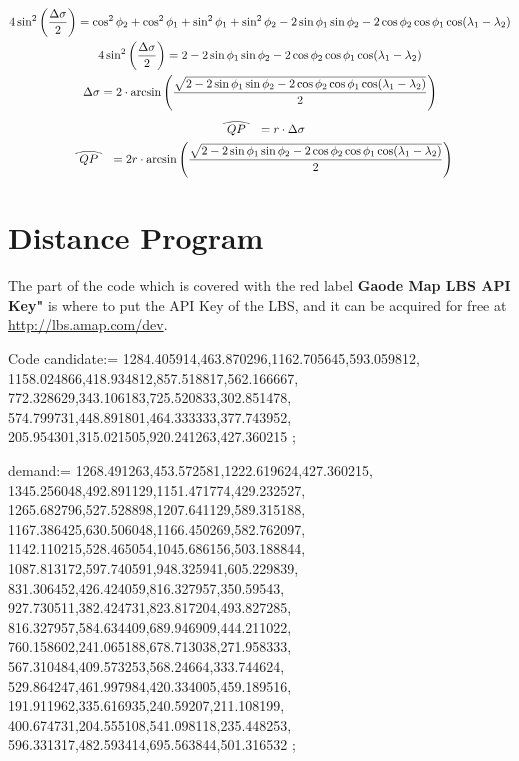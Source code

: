 \documentclass[10pt]{article}
\newcommand\bigfrown[2][\textstyle]{\ensuremath{%
  \array[b]{c}\text{\resizebox{6ex}{.7ex}{$#1\frown$}}\\[-1.3ex]#1#2\endarray}}
\begin{document}
\begin{gather}
4\sin^2\left(\frac{\Delta\sigma}{2}\right)=\cos^2\phi_2+\cos^2\phi_1+\sin^2\phi_1+\sin^2\phi_2-2\sin\phi_1\sin\phi_2-2\cos\phi_2\cos\phi_1\cos(\lambda_1-\lambda_2)\\
\allowdisplaybreaks
4\sin^2\left(\frac{\Delta\sigma}{2}\right)=2-2\sin\phi_1\sin\phi_2-2\cos\phi_2\cos\phi_1\cos(\lambda_1-\lambda_2)\\
\allowdisplaybreaks
\Delta\sigma=2\cdot\arcsin\left(\frac{\sqrt{2-2\sin\phi_1\sin\phi_2-2\cos\phi_2\cos\phi_1\cos(\lambda_1-\lambda_2)}}{2}\right)\\
\allowdisplaybreaks
\bigfrown{QP}=r\cdot\Delta\sigma\\
\allowdisplaybreaks
\bigfrown{QP}=2r\cdot\arcsin\left(\frac{\sqrt{2-2\sin\phi_1\sin\phi_2-2\cos\phi_2\cos\phi_1\cos(\lambda_1-\lambda_2)}}{2}\right)
\end{gather}

\section{Distance Program}

The part of the code which is covered with the red label \textbf{Gaode Map LBS API Key"} is where to put the API Key of the LBS, and it can be acquired for free at \href{http://lbs.amap.com/dev}{http://lbs.amap.com/dev}.

\begin{mmaCell}[moredefined={candidate, demand}]{Code}
  candidate:={
    {1284.405914,463.870296},{1162.705645,593.059812},
    {1158.024866,418.934812},{857.518817,562.166667},
    {772.328629,343.106183},{725.520833,302.851478},
    {574.799731,448.891801},{464.333333,377.743952},
    {205.954301,315.021505},{920.241263,427.360215}
  };

  demand:={
    {1268.491263,453.572581},{1222.619624,427.360215},
    {1345.256048,492.891129},{1151.471774,429.232527},
    {1265.682796,527.528898},{1207.641129,589.315188},
    {1167.386425,630.506048},{1166.450269,582.762097},
    {1142.110215,528.465054},{1045.686156,503.188844},
    {1087.813172,597.740591},{948.325941,605.229839},
    {831.306452,426.424059},{816.327957,350.59543},
    {927.730511,382.424731},{823.817204,493.827285},
    {816.327957,584.634409},{689.946909,444.211022},
    {760.158602,241.065188},{678.713038,271.958333},
    {567.310484,409.573253},{568.24664,333.744624},
    {529.864247,461.997984},{420.334005,459.189516},
    {191.911962,335.616935},{240.59207,211.108199},
    {400.674731,204.555108},{541.098118,235.448253},
    {596.331317,482.593414},{695.563844,501.316532}
  };
\end{mmaCell}
\end{document}
